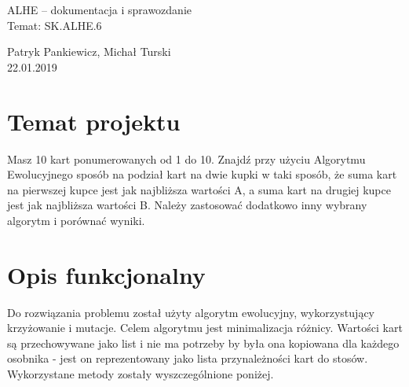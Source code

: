 \documentclass[12pt]{article}
\begin{document}
\begin{center}
\huge
ALHE -- dokumentacja i sprawozdanie\\
Temat: SK.ALHE.6 \\

\bigskip

\LARGE
Patryk Pankiewicz, Michał Turski \\
22.01.2019 
\end{center}

\newpage

\section{Temat projektu}

Masz 10 kart ponumerowanych od 1 do 10. Znajdź przy użyciu Algorytmu Ewolucyjnego sposób na podział kart na dwie kupki w taki sposób, że suma kart na pierwszej kupce jest jak najbliższa wartości A, a suma kart na drugiej kupce jest jak najbliższa wartości B. Należy zastosować dodatkowo inny wybrany algorytm i porównać wyniki.

\section{Opis funkcjonalny}
Do rozwiązania problemu został użyty algorytm ewolucyjny, wykorzystujący krzyżowanie i mutacje. Celem algorytmu jest minimalizacja różnicy. Wartości kart są przechowywane jako list i nie ma potrzeby by była ona kopiowana dla każdego osobnika - jest on reprezentowany jako lista przynależności kart do stosów. Wykorzystane metody zostały wyszczególnione poniżej. 
\end{document}
